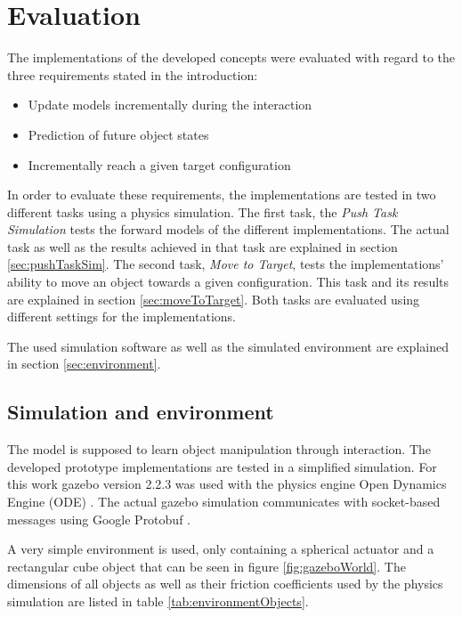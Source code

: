\chapter{Evaluation\label{chap:evaluation}}



The implementations of the developed concepts were evaluated with regard to the three requirements stated in the introduction: 
\begin{itemize}
\item Update models incrementally during the interaction
\item Prediction of future object states
\item Incrementally reach a given target configuration
\end{itemize}

In order to evaluate these requirements, the implementations are tested in two different tasks using a physics simulation. The first task, the \textit{Push Task Simulation} tests the forward models of the different implementations. The actual task as well as the results achieved in that task are explained in section \ref{sec:pushTaskSim}.
The second task, \textit{Move to Target}, tests the implementations' ability to move an object towards a given configuration. This task and its results are explained in section \ref{sec:moveToTarget}.
Both tasks are evaluated using different settings for the implementations.

The used simulation software as well as the simulated environment are explained in section \ref{sec:environment}.


\section{Simulation and environment \label{sec:environment}}

The model is supposed to learn object manipulation through interaction.
The developed prototype implementations are tested in a simplified simulation. For this work gazebo \cite{gazebo} version 2.2.3 was used with the physics engine Open Dynamics Engine (ODE) \cite{ode}.
The actual gazebo simulation communicates with socket-based messages using Google Protobuf \cite{protobuf}. 

A very simple environment is used, only containing a spherical actuator and a rectangular cube object that can be seen in figure \ref{fig:gazeboWorld}.
The dimensions of all objects as well as their friction coefficients used by the physics simulation are listed in table \ref{tab:environmentObjects}.

